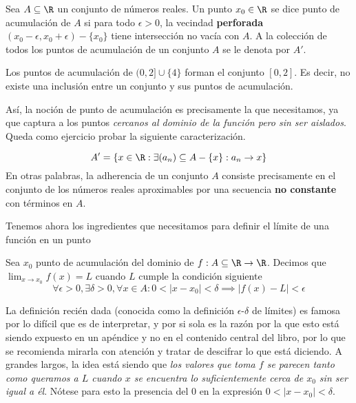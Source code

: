 \begin{definition}
    Sea $A \subseteq \R$ un conjunto de números reales. Un punto $x_0 \in \R$ se dice punto de acumulación de $A$ si para todo $\epsilon > 0$, la vecindad \textbf{perforada} $(x_0 - \epsilon, x_0 + \epsilon) - \{x_0\}$ tiene intersección no vacía con $A$. A la colección de todos los puntos de acumulación de un conjunto $A$ se le denota por $A'$.
\end{definition}

\begin{example}
    Los puntos de acumulación de $(0, 2] \cup \{4\}$ forman el conjunto $[0, 2]$. Es decir, no existe una inclusión entre un conjunto y sus puntos de acumulación.
\end{example}

Así, la noción de punto de acumulación es precisamente la que necesitamos, ya que captura a los puntos \textit{cercanos al dominio de la función pero sin ser aislados}. Queda como ejercicio probar la siguiente caracterización.

\begin{proposition}
    \[A' = \{x \in \R : \exists (a_n) \subseteq A - \{x\} : a_n \to x\}\]
    En otras palabras, la adherencia de un conjunto $A$ consiste precisamente en el conjunto de los números reales aproximables por una secuencia \textbf{no constante} con términos en $A$.
\end{proposition}

Tenemos ahora los ingredientes que necesitamos para definir el límite de una función en un punto

\begin{definition}
    Sea $x_0$ punto de acumulación del dominio de $f: A \subseteq \R \to \R$. Decimos que $\lim_{x \to x_0}f(x) = L$ cuando $L$ cumple la condición siguiente
    \[\forall \epsilon > 0, \exists \delta > 0, \forall x \in A: 0 < |x - x_0| < \delta \implies |f(x) - L| < \epsilon\]
\end{definition}

\begin{remark}
    La definición recién dada (conocida como la definición $\epsilon$-$\delta$ de límites) es famosa por lo difícil que es de interpretar, y por si sola es la razón por la que esto está siendo expuesto en un apéndice y no en el contenido central del libro, por lo que se recomienda mirarla con atención y tratar de descifrar lo que está diciendo. A grandes largos, la idea está siendo que \textit{los valores que toma $f$ se parecen tanto como queramos a $L$ cuando $x$ se encuentra lo suficientemente cerca de $x_0$ sin ser igual a él}. Nótese para esto la presencia del $0$ en la expresión $0 < |x - x_0| < \delta$.
\end{remark}

